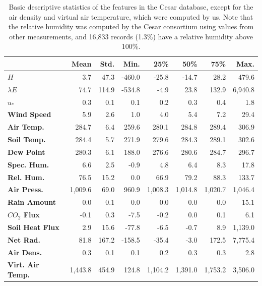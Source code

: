 \documentclass[a4paper]{book}
\begin{document}
\begin{table}[]
\centering
\caption{Basic descriptive statistics of the features in the Cesar database, except for the air density and virtual air temperature, which were computed by us.  Note that the relative humidity was computed by the Cesar consortium using values from other measurements, and 16,833 records  (1.3\%) have a relative humidity above 100\%.}
\label{tbl:col_summary}
\begin{tabular*}{\textwidth}{l| @{\extracolsep{\fill}} rrrrrrr}
\toprule
& \textbf{Mean} & \textbf{Std.} & \textbf{Min.} & \textbf{25\%} & \textbf{50\%} & \textbf{75\%} & \textbf{Max.} \\ \midrule
\textbf{$H$} & 3.7 & 47.3 & -460.0 & -25.8 & -14.7 & 28.2 & 479.6 \\
\textbf{$\lambda E$} & 74.7 & 114.9 & -534.8 & -4.9 & 23.8 & 132.9 & 6,940.8 \\
\textbf{$u_*$} & 0.3 & 0.1 & 0.1 & 0.2 & 0.3 & 0.4 & 1.8 \\
\textbf{Wind Speed} & 5.9 & 2.6 & 1.0 & 4.0 & 5.4 & 7.2 & 29.4 \\
\textbf{Air Temp.} & 284.7 & 6.4 & 259.6 & 280.1 & 284.8 & 289.4 & 306.9 \\
\textbf{Soil Temp.} & 284.4 & 5.7 & 271.9 & 279.6 & 284.3 & 289.1 & 302.6 \\
\textbf{Dew Point} & 280.3 & 6.1 & 188.0 & 276.6 & 280.6 & 284.7 & 296.7 \\
\textbf{Spec. Hum.} & 6.6 & 2.5 & -0.9 & 4.8 & 6.4 & 8.3 & 17.8 \\
\textbf{Rel. Hum.} & 76.5 & 15.2 & 0.0 & 66.9 & 79.2 & 88.3 & 133.7 \\
\textbf{Air Press.} & 1,009.6 & 69.0 & 960.9 & 1,008.3 & 1,014.8 & 1,020.7 & 1,046.4 \\
\textbf{Rain Amount} & 0.0 & 0.1 & 0.0 & 0.0 & 0.0 & 0.0 & 15.1 \\
\textbf{$CO_2$ Flux} & -0.1 & 0.3 & -7.5 & -0.2 & 0.0 & 0.1 & 6.1 \\
\textbf{Soil Heat Flux} & 2.9 & 15.6 & -77.8 & -6.5 & -0.7 & 8.9 & 1,139.0 \\
\textbf{Net Rad.} & 81.8 & 167.2 & -158.5 & -35.4 & -3.0 & 172.5 & 7,775.4 \\
\textbf{Air Dens.} & 0.3 & 0.1 & 0.1 & 0.2 & 0.3 & 0.3 & 2.8 \\
\textbf{Virt. Air Temp.} & 1,443.8 & 454.9 & 124.8 & 1,104.2 & 1,391.0 & 1,753.2 & 3,506.0 \\
\bottomrule
\end{tabular*}
\end{table}
\end{document}
